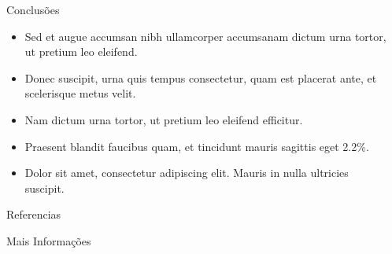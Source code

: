 \documentclass[final]{beamer}
\newlength{\sepwidth}
\newlength{\colwidth}
\newcommand{\separatorcolumn}{\begin{column}{\sepwidth}\end{column}}
\begin{document}
\begin{frame}[t]
\begin{columns}[t]
\begin{column}{\colwidth}
   \begin{exampleblock}{Conclusões}
    \begin{itemize}
      \item Sed et augue accumsan nibh ullamcorper accumsanam dictum urna tortor, ut pretium leo eleifend.  
      \item Donec suscipit, urna quis tempus consectetur, quam est placerat ante, et scelerisque metus velit. 
      \item Nam dictum urna tortor, ut pretium leo eleifend efficitur.
      \item Praesent blandit faucibus quam, et tincidunt mauris sagittis eget 2.2\%.
      \item Dolor sit amet, consectetur adipiscing elit. Mauris in nulla ultricies suscipit.
    \end{itemize}
  \end{exampleblock}


  \begin{block}{Referencias}

    \nocite{*}
    \footnotesize{}

  \end{block}

  \begin{block}{Mais Informações}

    

  \end{block}

\end{column}
\separatorcolumn



\end{columns}
\end{frame}
\end{document}
